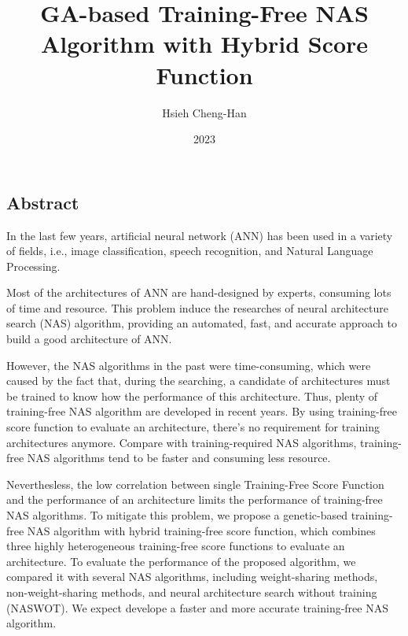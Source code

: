 \documentclass[twocolumn,10pt]{article}
\title{GA-based Training-Free NAS Algorithm with Hybrid Score Function}
\author{Hsieh Cheng-Han}
\date{2023}
\begin{document}
\begin{CJK*}{UTF8}{bsmi}

\maketitle

\section{Abstract}
    In the last few years, artificial neural network (ANN) has been used in a variety of fields, i.e., image classification, speech recognition, and Natural Language Processing.\par
    
    Most of the architectures of ANN are hand-designed by experts, consuming lots of time and resource. This problem induce the researches of neural architecture search (NAS) algorithm, providing an automated, fast, and accurate approach to build a good architecture of ANN.\par
    
    However, the NAS algorithms in the past were time-consuming, which were caused by the fact that, during the searching, a candidate of architectures must be trained to know how the performance of this architecture. Thus, plenty of training-free NAS algorithm are developed in recent years. By using training-free score function to evaluate an architecture, there's no requirement for training architectures anymore. Compare with training-required NAS algorithms, training-free NAS algorithms tend to be faster and consuming less resource.\par

    Neverthesless, the low correlation between single Training-Free Score Function and the performance of an architecture limits the performance of training-free NAS algorithms. To mitigate this problem, we propose a genetic-based training-free NAS algorithm with hybrid training-free score function, which combines three highly heterogeneous training-free score functions to evaluate an architecture. To evaluate the performance of the proposed algorithm, we compared it with several NAS algorithms, including weight-sharing methods, non-weight-sharing methods, and neural architecture search without training (NASWOT). We expect develope a faster and more accurate training-free NAS algorithm.\par

\begin{thebibliography}{9}
\end{thebibliography}


\end{CJK*}
\end{document}
